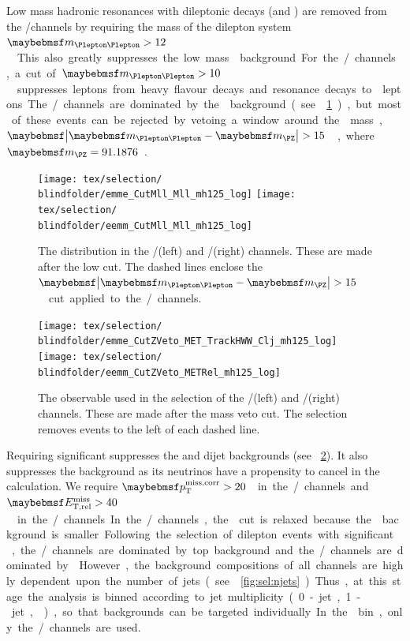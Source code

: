 Low mass hadronic resonances with dileptonic decays (\eg \PJpsi and \PUpsilon) are removed 
from the \eech/\mmch channels by requiring the mass of the dilepton system 
\unit{$\mll > 12$}{\GeV}. This also greatly suppresses the low mass \DY background. For the 
\emch/\mech channels, a cut of \unit{$\mll > 10$}{\GeV} suppresses leptons from heavy 
flavour decays and resonance decays to \Ptau leptons. The \eech/\mmch channels are dominated 
by the \DY background (see \Figure~\ref{fig:sel:mll}), but most of these events can be 
rejected by vetoing a window around the \PZ mass, \unit{$\mods{\mll - \mZ} > 15$}{\GeV}, 
where \unit{$\mZ = 91.1876$}{\GeV}.

\begin{figure}
	\texttt{[image: tex/selection/\\blindfolder/emme\_CutMll\_Mll\_mh125\_log]}
	\hfill
	\texttt{[image: tex/selection/\\blindfolder/eemm\_CutMll\_Mll\_mh125\_log]}
	\caption{The \mll distribution in the \emch/\mech (left) and \eech/\mmch (right) 
	channels. These are made after the low \mll cut. The dashed lines enclose the 
	\unit{$\mods{\mll - \mZ} > 15$}{\GeV} cut applied to the \eech/\mmch channels.}
	\label{fig:sel:mll}
\end{figure}

\begin{figure}
	\texttt{[image: tex/selection/\\blindfolder/emme\_CutZVeto\_MET\_TrackHWW\_Clj\_mh125\_log]}
	\hfill
	\texttt{[image: tex/selection/\\blindfolder/eemm\_CutZVeto\_METRel\_mh125\_log]}
	\caption{The \met observable used in the selection of the \emch/\mech (left) and 
	\eech/\mmch (right) channels. These are made after the \PZ mass veto cut. The selection 
	removes events to the left of each dashed line.}
	\label{fig:sel:met}
\end{figure}

Requiring significant \met suppresses the \DYll and dijet backgrounds (see 
\Figure~\ref{fig:sel:met}). It also suppresses the \DYtt background as its neutrinos have a 
propensity to cancel in the \met calculation. We require \unit{$\corrtrackmet > 20$}{\GeV} 
in the \emch/\mech channels and \unit{$\calometrel > 40$}{\GeV} in the \eech/\mmch channels. In 
the \emch/\mech channels, the \met cut is relaxed because the \DYll background is smaller. 

Following the selection of dilepton events with significant \met, the \emch/\mech 
channels are dominated by top background and the \eech/\mmch channels are dominated by 
\DYll. However, the background compositions of all channels are highly dependent upon the 
number of jets (see \Figure~\ref{fig:sel:njets}). Thus, at this stage the analysis is 
binned according to jet multiplicity (0-jet, 1-jet, \twojet), so that backgrounds can be 
targeted individually. In the \twojet bin, only the \emch/\mech channels are used.

